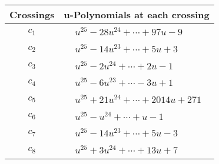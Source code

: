 \documentclass[1p]{elsarticle_modified}
\theoremstyle{definition}
\begin{document}
\begin{tabular}{m{50pt}|m{274pt}}
Crossings & \hspace{64pt}u-Polynomials at each crossing \\
\hline $$\begin{aligned}c_{1}\end{aligned}$$&$\begin{aligned}
&u^{25}-28 u^{24}+\cdots+97 u-9
\end{aligned}$\\
\hline $$\begin{aligned}c_{2}\end{aligned}$$&$\begin{aligned}
&u^{25}-14 u^{23}+\cdots+5 u+3
\end{aligned}$\\
\hline $$\begin{aligned}c_{3}\end{aligned}$$&$\begin{aligned}
&u^{25}-2 u^{24}+\cdots+2 u-1
\end{aligned}$\\
\hline $$\begin{aligned}c_{4}\end{aligned}$$&$\begin{aligned}
&u^{25}-6 u^{23}+\cdots-3 u+1
\end{aligned}$\\
\hline $$\begin{aligned}c_{5}\end{aligned}$$&$\begin{aligned}
&u^{25}+21 u^{24}+\cdots+2014 u+271
\end{aligned}$\\
\hline $$\begin{aligned}c_{6}\end{aligned}$$&$\begin{aligned}
&u^{25}- u^{24}+\cdots+u-1
\end{aligned}$\\
\hline $$\begin{aligned}c_{7}\end{aligned}$$&$\begin{aligned}
&u^{25}-14 u^{23}+\cdots+5 u-3
\end{aligned}$\\
\hline $$\begin{aligned}c_{8}\end{aligned}$$&$\begin{aligned}
&u^{25}+3 u^{24}+\cdots+13 u+7
\end{aligned}$\\

\end{tabular}
\end{document}
